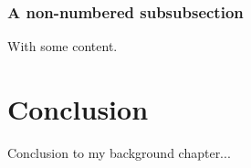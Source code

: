 \subsubsection*{A non-numbered subsubsection}

With some content.

\section{Conclusion}

Conclusion to my background chapter...


































